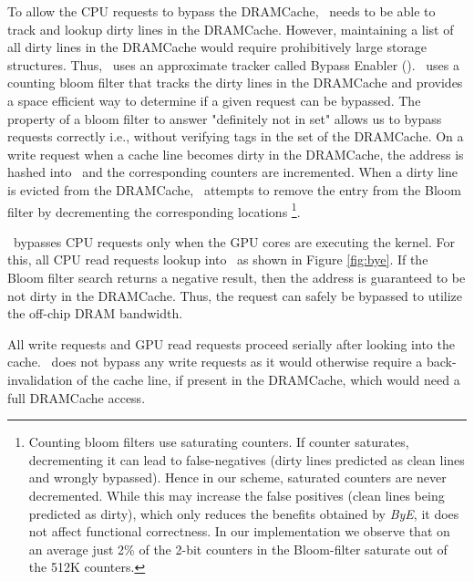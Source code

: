 \par To allow the CPU requests to bypass the DRAMCache, \cachename\ needs to be able to track and lookup dirty lines in the DRAMCache. However, maintaining a list of all dirty lines in the DRAMCache would require prohibitively large storage structures. Thus, \cachename\ uses an approximate tracker called Bypass Enabler (\bypassname). \bypassname\ uses a counting bloom filter \cite{bloom,counting-bloom} that tracks the dirty lines in the DRAMCache and provides a space efficient way to determine if a given request can be bypassed. The property of a bloom filter to answer "definitely not in set" allows us to bypass requests correctly i.e., without verifying tags in the set of the DRAMCache. 
On a write request when a cache line becomes dirty in the DRAMCache, the address is hashed into \bypassname\ and the corresponding counters are incremented. When a dirty line is evicted from the DRAMCache, \bypassname\ attempts to remove the entry from the Bloom filter by decrementing the corresponding locations 
\footnote{Counting bloom filters use saturating counters. If counter saturates, decrementing it can lead to false-negatives (dirty lines predicted as clean lines and wrongly bypassed). Hence in our scheme, saturated counters are never decremented.  While this may increase the false positives (clean lines being predicted as dirty), which only reduces the benefits obtained by \textit{ByE}, it does not affect functional correctness. In our implementation we observe that on an average just 2\% of the 2-bit counters in the Bloom-filter saturate out of the 512K counters.}.
\par \bypassname\ bypasses CPU requests only when the GPU cores are executing the kernel. For this, all CPU read requests lookup into \bypassname\ as shown in Figure \ref{fig:bye}. If the Bloom filter search returns a  negative result, then the address is guaranteed to be not dirty in the DRAMCache. Thus, the request can safely be bypassed to utilize the off-chip DRAM bandwidth. 
\par All write requests and GPU read requests proceed serially after looking into the cache. \bypassname\ does not bypass any write requests as it would otherwise require a back-invalidation of the cache line, if present in the DRAMCache, which would need a full DRAMCache access.


